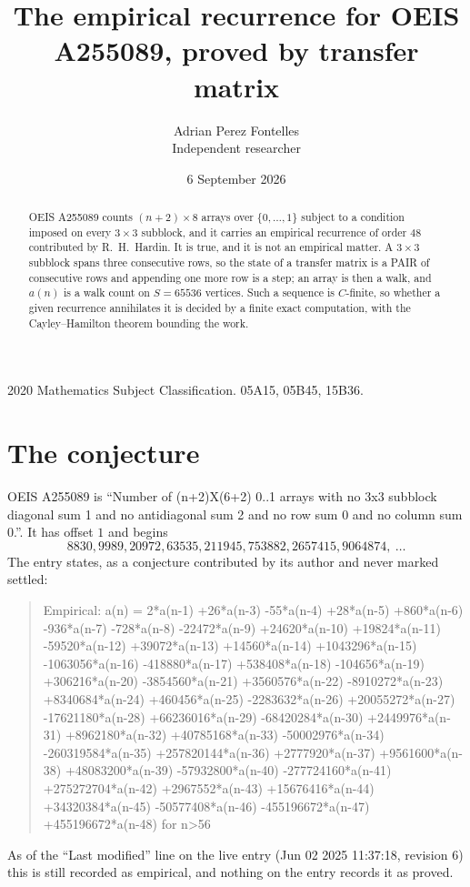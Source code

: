 \documentclass[11pt,a4paper]{article}
\title{The empirical recurrence for OEIS A255089, proved by transfer matrix}
\author{Adrian Perez Fontelles\\ \small Independent researcher}
\date{6 September 2026}
\theoremstyle{plain}
\theoremstyle{definition}
\begin{document}
\maketitle

\begin{abstract}
OEIS A255089 counts $(n+2)\times8$ arrays over $\{0,\dots,1\}$ subject to a condition imposed on
every $3\times3$ subblock, and it carries an empirical recurrence of order $48$
contributed by R.~H.~Hardin. It is true, and it is not an empirical matter. A $3\times3$
subblock spans three consecutive rows, so the state of a transfer matrix is a PAIR of
consecutive rows and appending one more row is a step; an array is then a walk, and
$a(n)$ is a walk count on $S=65536$ vertices. Such a sequence is $C$-finite, so whether a given
recurrence annihilates it is decided by a finite exact computation, with the Cayley--Hamilton
theorem bounding the work.
\end{abstract}

\noindent\small 2020 Mathematics Subject Classification. 05A15, 05B45, 15B36.\normalsize

\section{The conjecture}

OEIS A255089 is ``Number of (n+2)X(6+2) 0..1 arrays with no 3x3 subblock diagonal sum 1 and no antidiagonal sum 2 and no row sum 0 and no column sum 0.''. It has offset $1$ and begins
\[
8830, 9989, 20972, 63535, 211945, 753882, 2657415, 9064874,\ \dots
\]
The entry states, as a conjecture contributed by its author and never marked settled:
\begin{quote}
Empirical: a(n) = 2*a(n-1) +26*a(n-3) -55*a(n-4) +28*a(n-5) +860*a(n-6) -936*a(n-7) -728*a(n-8) -22472*a(n-9) +24620*a(n-10) +19824*a(n-11) -59520*a(n-12) +39072*a(n-13) +14560*a(n-14) +1043296*a(n-15) -1063056*a(n-16) -418880*a(n-17) +538408*a(n-18) -104656*a(n-19) +306216*a(n-20) -3854560*a(n-21) +3560576*a(n-22) -8910272*a(n-23) +8340684*a(n-24) +460456*a(n-25) -2283632*a(n-26) +20055272*a(n-27) -17621180*a(n-28) +66236016*a(n-29) -68420284*a(n-30) +2449976*a(n-31) +8962180*a(n-32) +40785168*a(n-33) -50002976*a(n-34) -260319584*a(n-35) +257820144*a(n-36) +2777920*a(n-37) +9561600*a(n-38) +48083200*a(n-39) -57932800*a(n-40) -277724160*a(n-41) +275272704*a(n-42) +2967552*a(n-43) +15676416*a(n-44) +34320384*a(n-45) -50577408*a(n-46) -455196672*a(n-47) +455196672*a(n-48) for n>56
\end{quote}
As of the ``Last modified'' line on the live entry (Jun 02 2025 11:37:18, revision 6) this is still
recorded as empirical, and nothing on the entry records it as proved.
\end{document}
